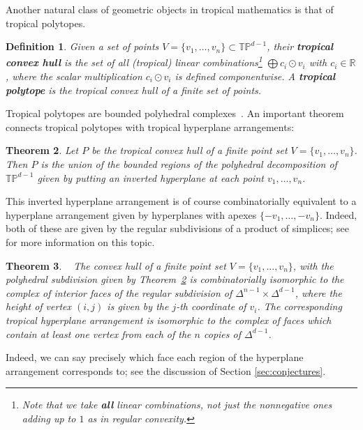 \documentclass[11pt]{amsart}
\newtheorem{thm}{Theorem}[section]
\newtheorem{defn}[thm]{Definition}
\newcommand{\RR}{\mathbb{R}}
\newcommand{\TP}{\mathbb{TP}}
\begin{document}
Another natural class of geometric objects in tropical mathematics is that of 
tropical polytopes.

\begin{defn}
Given a set of points $V=\{v_1,\ldots,v_n\} \subset \TP^{d-1}$, their \textbf{tropical convex 
hull} is 
the set of all (tropical) linear combinations\footnote{Note that we take 
{\bf all} linear combinations, not just the nonnegative ones adding up to $1$ as in regular convexity.} $\bigoplus c_i \odot v_i$ with $c_i \in \RR$, where the scalar multiplication $c_i \odot v_i$ is defined componentwise.
A \textbf{tropical polytope} is the 
tropical convex hull of a finite set of points. 
\end{defn}

Tropical polytopes are bounded polyhedral complexes~\cite{DS}. An important theorem 
connects tropical polytopes with tropical hyperplane arrangements:

\begin{thm}\cite{DS}\label{TP=THA}
Let $P$ be the tropical convex hull of a finite point set $V = \{v_1, \ldots, 
v_n\}$. Then $P$ is the union of the bounded regions of the polyhedral 
decomposition of $\TP^{d-1}$ given by putting an inverted hyperplane at each point 
$v_1, \ldots, v_n$.
\end{thm}

This inverted hyperplane arrangement is of course combinatorially equivalent to a 
hyperplane arrangement given by hyperplanes with apexes $\{-v_1, \ldots,-v_n\}$. 
Indeed, both of these are given by the regular subdivisions of a product of simplices; see \cite{Sturmfels, Ziegler} for more information on
this topic.

\begin{thm}~\cite{DS}
The convex hull of a finite point set $V = \{v_1, \ldots, v_n\}$, with the polyhedral subdivision given by 
Theorem~\ref{TP=THA} is combinatorially isomorphic to the complex of interior faces of the regular subdivision of 
$\Delta^{n-1}\times \Delta^{d-1}$, where the height of vertex $(i, j)$ is given by the $j$-th coordinate of $v_i$. The 
corresponding tropical hyperplane arrangement is isomorphic to the complex of %
faces which contain at least 
one vertex from each of the $n$ copies of $\Delta^{d-1}$.
\end{thm}

Indeed, we can say precisely 
which face each region of the hyperplane arrangement corresponds to; see the 
discussion of Section \ref{sec:conjectures}.
\end{document}
